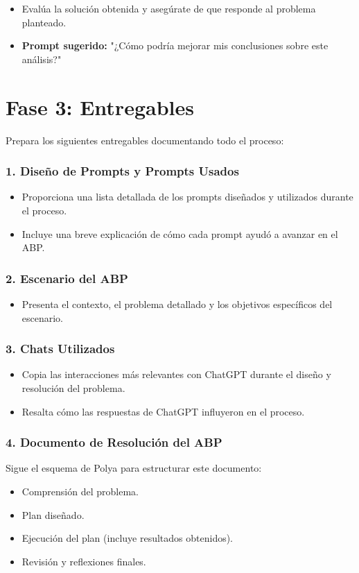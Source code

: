 \documentclass[a4paper,12pt]{article}
\begin{document}
\begin{itemize}
    \item Evalúa la solución obtenida y asegúrate de que responde al problema planteado.
    \item \textbf{Prompt sugerido:} "¿Cómo podría mejorar mis conclusiones sobre este análisis?"
\end{itemize}

\section*{Fase 3: Entregables}

Prepara los siguientes entregables documentando todo el proceso:

\subsubsection*{1. Diseño de Prompts y Prompts Usados}

\begin{itemize}
    \item Proporciona una lista detallada de los prompts diseñados y utilizados durante el proceso.
    \item Incluye una breve explicación de cómo cada prompt ayudó a avanzar en el ABP.
\end{itemize}

\subsubsection*{2. Escenario del ABP}

\begin{itemize}
    \item Presenta el contexto, el problema detallado y los objetivos específicos del escenario.
\end{itemize}

\subsubsection*{3. Chats Utilizados}

\begin{itemize}
    \item Copia las interacciones más relevantes con ChatGPT durante el diseño y resolución del problema.
    \item Resalta cómo las respuestas de ChatGPT influyeron en el proceso.
\end{itemize}

\subsubsection*{4. Documento de Resolución del ABP}

Sigue el esquema de Polya para estructurar este documento:

\begin{itemize}
    \item Comprensión del problema.
    \item Plan diseñado.
    \item Ejecución del plan (incluye resultados obtenidos).
    \item Revisión y reflexiones finales.
\end{itemize}
\end{document}
